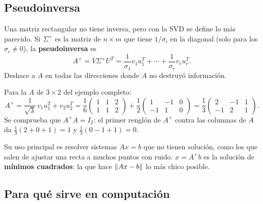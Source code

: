 \documentclass[11pt,letterpaper]{article}
\begin{document}

\subsection*{Pseudoinversa}

Una matriz rectangular no tiene inversa, pero con la SVD se define lo
más parecido. Si $\Sigma^{+}$ es la matriz de $n \times m$ que tiene
$1/\sigma_i$ en la diagonal (solo para los $\sigma_i \neq 0$), la
\textbf{pseudoinversa} es
\[
    A^{+} = V \Sigma^{+} U^{T}
          = \frac{1}{\sigma_1} v_1 u_1^{T} + \cdots
            + \frac{1}{\sigma_r} v_r u_r^{T} .
\]
Deshace a $A$ en todas las direcciones donde $A$ no destruyó
información.

\begin{ejemplo}
    Para la $A$ de $3 \times 2$ del ejemplo completo:
    \[
        A^{+} = \frac{1}{\sqrt{3}}\, v_1 u_1^{T} + v_2 u_2^{T}
        = \frac{1}{6}\begin{pmatrix} 1 & 1 & 2 \\ 1 & 1 & 2
          \end{pmatrix}
        + \frac{1}{2}\begin{pmatrix} 1 & -1 & 0 \\ -1 & 1 & 0
          \end{pmatrix}
        = \frac{1}{3}\begin{pmatrix} 2 & -1 & 1 \\ -1 & 2 & 1
          \end{pmatrix} .
    \]
    Se comprueba que $A^{+}A = I_2$: el primer renglón de $A^{+}$
    contra las columnas de $A$ da
    $\tfrac{1}{3}(2 + 0 + 1) = 1$ y $\tfrac{1}{3}(0 - 1 + 1) = 0$.
\end{ejemplo}

Su uso principal es resolver sistemas $Ax = b$ que no tienen solución,
como los que salen de ajustar una recta a muchos puntos con ruido.
$x = A^{+}b$ es la solución de \textbf{mínimos cuadrados}: la que hace
$\left\lVert Ax - b \right\rVert$ lo más chico posible.


\subsection*{Para qué sirve en computación}
\end{document}
